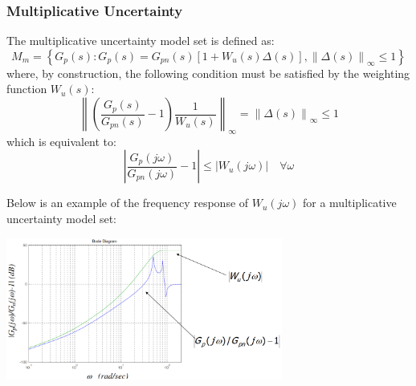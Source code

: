 \documentclass{article}
\numberwithin{equation}{subsection}
\begin{document}
	\raggedright
	\subsubsection{Multiplicative Uncertainty}
	The multiplicative uncertainty model set is defined as:
	\begin{equation}
		M_m = \left\{ G_p(s): G_p(s)=G_{pn}(s) \left[1+W_u(s)\Delta(s)\right], \left\lVert\Delta(s)\right\rVert_\infty \leq1 \right\}
	\end{equation}
	where, by construction, the following condition must be satisfied by the weighting function $W_u(s)$:
	\begin{equation}
		\left\lVert \left( \dfrac{G_p(s)}{G_{pn}(s)}-1 \right) \dfrac{1}{W_u(s)}\right\rVert_\infty = \left\lVert \Delta(s) \right\rVert_\infty \leq 1
	\end{equation}
	which is equivalent to:
	\begin{equation}
		\left| \dfrac{G_p(j\omega)}{G_{pn}(j\omega)}-1 \right| \leq \left| W_u(j\omega) \right| \quad \forall \omega
	\end{equation}
	
	Below is an example of the frequency response of $W_u(j\omega)$ for a multiplicative uncertainty model set:
	
	\centering
	\includegraphics[width=0.68\textwidth]{images/multiplicative_uncertainty.png}
	\label{fig:image4}
	
\end{document}

